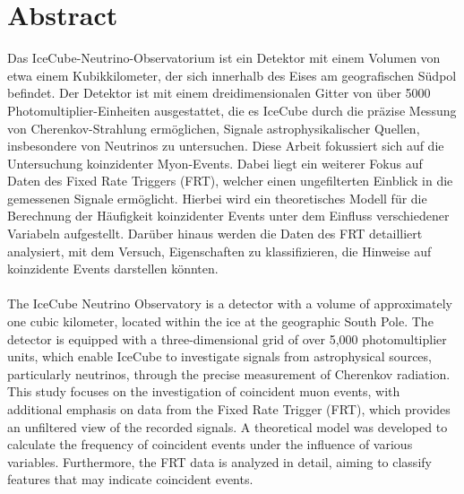 

\section*{Abstract}
Das IceCube-Neutrino-Observatorium ist ein Detektor mit einem Volumen von etwa einem Kubikkilometer, der sich innerhalb des Eises am geografischen Südpol befindet. 
Der Detektor ist mit einem dreidimensionalen Gitter von über 5000 Photomultiplier-Einheiten ausgestattet, die es IceCube durch die präzise Messung von 
Cherenkov-Strahlung ermöglichen, Signale astrophysikalischer Quellen, insbesondere von Neutrinos zu untersuchen. Diese Arbeit fokussiert sich auf die Untersuchung
koinzidenter Myon-Events. Dabei liegt ein weiterer Fokus auf Daten des Fixed Rate Triggers (FRT), welcher einen ungefilterten Einblick in die gemessenen Signale ermöglicht.
Hierbei wird ein theoretisches Modell für die Berechnung der Häufigkeit koinzidenter Events unter dem Einfluss verschiedener Variabeln aufgestellt. 
Darüber hinaus 
werden die Daten des FRT detailliert analysiert, mit dem Versuch, Eigenschaften zu klassifizieren, die Hinweise auf koinzidente Events darstellen könnten. \\ \\

The IceCube Neutrino Observatory is a detector with a volume of approximately one cubic kilometer, located within the ice at the geographic South Pole. The detector 
is equipped with a three-dimensional grid of over 5,000 photomultiplier units, which enable IceCube to investigate signals from astrophysical sources, particularly 
neutrinos, through the precise measurement of Cherenkov radiation. This study focuses on the investigation of coincident muon events, with additional emphasis on 
data from the Fixed Rate Trigger (FRT), which provides an unfiltered view of the recorded signals. A theoretical model was developed to calculate the frequency of 
coincident events under the influence of various variables. Furthermore, the FRT data is analyzed in detail, aiming to classify features that may indicate coincident 
events.

